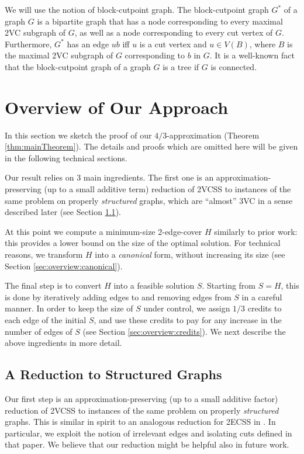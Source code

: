 \documentclass{article}
\begin{document}
We will use the notion of block-cutpoint graph. The block-cutpoint graph $G^*$ of a graph $G$ is a bipartite graph that has a node corresponding to every maximal 2VC subgraph of $G$, as well as a node corresponding to every cut vertex of $G$. Furthermore, $G^*$ has an edge $ub$ iff $u$ is a cut vertex and $u\in V(B)$, where $B$ is the maximal 2VC subgraph of $G$ corresponding to $b$ in $G$. It is a well-known fact~\cite[Chapter~3]{west2001introduction} that the block-cutpoint graph of a graph $G$ is a tree if $G$ is connected.

\section{Overview of Our Approach}
\label{sec:overview}

In this section we sketch the proof of our $4/3$-approximation (Theorem \ref{thm:mainTheorem}). The details and proofs which are omitted here will be given in the following technical sections. 

Our result relies on $3$ main ingredients. The first one is an approximation-preserving (up to a small additive term) reduction of 2VCSS to instances of the same problem on properly \emph{structured} graphs, which are ``almost'' 3VC in a sense described later (see Section \ref{sec:overview:structured}).

At this point we compute a minimum-size 2-edge-cover $H$ similarly to prior work: this provides a lower bound on the size of the optimal solution. For technical reasons, we transform $H$ into a \emph{canonical} form,  without increasing its size (see Section \ref{sec:overview:canonical}).

The final step is to convert $H$ into a feasible solution $S$. Starting from $S=H$, this is done by iteratively adding edges to and removing edges from $S$ in a careful manner. In order to keep the size of $S$ under control, we assign $1/3$ credits to each edge of the initial $S$, and use these credits to pay for any increase in the number of edges of $S$ (see Section \ref{sec:overview:credits}). We next describe the above ingredients in more detail.

\subsection{A Reduction to Structured Graphs}
\label{sec:overview:structured}

Our first step is an approximation-preserving (up to a small additive factor) reduction of 2VCSS to instances of the same problem on properly \emph{structured} graphs. This is similar in spirit to an analogous reduction for 2ECSS in \cite{GGJ23}. In particular, we exploit the notion of irrelevant edges and isolating cuts defined in that paper. We believe that our reduction might be helpful also in future work.
\end{document}
